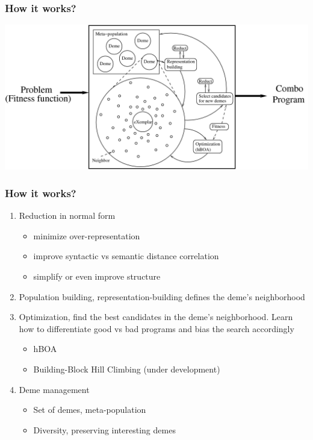 \documentclass{beamer}
\begin{document}
\frame
{
  \frametitle{How it works?}

  \begin{center}

  \includegraphics[scale=0.2]{MOSESSumDetails.png}

  \end{center}  

}

\frame
{

  \frametitle{How it works?}

  \begin{enumerate}
  \item<+-> Reduction in \alert{normal form}
    \begin{itemize}
    \item minimize over-representation
    \item improve syntactic vs semantic distance correlation
    \item simplify or even improve structure
    \end{itemize}
  \item<+-> Population building, \alert{representation-building}
    defines the \alert{deme's neighborhood}
  \item<+-> Optimization, find the best candidates in the deme's neighborhood.
    Learn how to \alert{differentiate good vs bad programs} and
    \alert{bias the search} accordingly
    \begin{itemize}
    \item hBOA
    \item Building-Block Hill Climbing (under development)
    \end{itemize}
  \item<+-> Deme management
    \begin{itemize}
    \item Set of demes, \alert{meta-population}
    \item Diversity, \alert{preserving interesting demes}
    \end{itemize}
  \end{enumerate}
}
\end{document}

